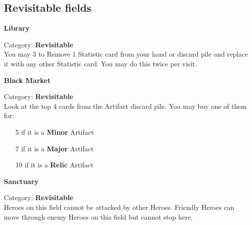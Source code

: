 \begin{multicols}{2}
\subsection*{Revisitable fields}

\begin{minipage}{\linewidth}
  \begin{center}
    \textbf{Library}\medskip
  \end{center}
  \small{Category: \textbf{Revisitable}\\
    You may 
    3 
    to Remove 1 Statistic card from   your hand or discard pile and replace it with any other Statistic card.
    You may do this twice per visit.
  }
\end{minipage}

\medskip

\begin{minipage}{\linewidth}
  \begin{center}
    \textbf{Black Market}\medskip
  \end{center}
  \small{Category: \textbf{Revisitable}\\
    Look at the top 4 cards from the Artifact discard pile.
    You may buy one of them for:
    \begin{itemize}
      \setlength\itemsep{-3pt}
      \item [5]  if it is a \textbf{Minor} Artifact
      \item [7]  if it is a \textbf{Major} Artifact
      \item [10]  if it is a \textbf{Relic} Artifact
    \end{itemize}
  }
\end{minipage}

\medskip

\begin{minipage}{\linewidth}
  \begin{center}
    \textbf{Sanctuary}\medskip
  \end{center}
  \small{Category: \textbf{Revisitable}\\
    Heroes on this field cannot be attacked by other Heroes.
    Friendly Heroes can move through enemy Heroes on this field but cannot stop here.}
\end{minipage}


\end{multicols}
